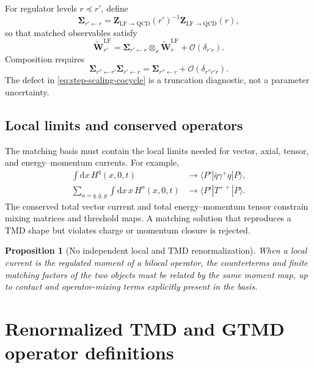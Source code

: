 \documentclass[11pt]{article}
\newtheorem{proposition}[definition]{Proposition}
\newcommand{\dd}{\mathrm{d}}
\newcommand{\LF}{\mathrm{LF}}
\newcommand{\QCD}{\mathrm{QCD}}
\newcommand{\cO}{\mathcal O}
\newcommand{\otimesx}{\mathop{\otimes}_{x}}
\begin{document}
For regulator levels \(r\preceq r'\), define
\begin{equation}
 \bm\Sigma_{r'\leftarrow r}
 =
 \bm Z_{\LF\to\QCD}(r')^{-1}
 \bm Z_{\LF\to\QCD}(r),
 \label{eq:step-scaling-map}
\end{equation}
so that matched observables satisfy
\begin{equation}
 \widetilde{\bm W}^{\LF}_{r'}
 =
 \bm\Sigma_{r'\leftarrow r}\otimesx
 \widetilde{\bm W}^{\LF}_{r}
 +\cO(\delta_{r'r}).
 \label{eq:step-scaling-consistency}
\end{equation}
Composition requires
\begin{equation}
 \bm\Sigma_{r''\leftarrow r'}
 \bm\Sigma_{r'\leftarrow r}
 =
 \bm\Sigma_{r''\leftarrow r}
 +\cO(\delta_{r''r'r}).
 \label{eq:step-scaling-cocycle}
\end{equation}
The defect in \cref{eq:step-scaling-cocycle} is a truncation diagnostic, not a
parameter uncertainty.

\subsection{Local limits and conserved operators}

The matching basis must contain the local limits needed for vector, axial,
tensor, and energy--momentum currents.  For example,
\begin{align}
 \int\dd x\,H^q(x,0,t)
 &\longrightarrow
 \langle P'|\bar q\gamma^+q|P\rangle,
 \label{eq:vector-local-limit}\\
 \sum_{a=q,\bar q,g}\int\dd x\,x\,H^a(x,0,t)
 &\longrightarrow
 \langle P'|T^{++}|P\rangle.
 \label{eq:emt-local-limit}
\end{align}
The conserved total vector current and total energy--momentum tensor constrain
mixing matrices and threshold maps.  A matching solution that reproduces a
TMD shape but violates charge or momentum closure is rejected.

\begin{proposition}[No independent local and TMD renormalization]
When a local current is the regulated moment of a bilocal operator, the
counterterms and finite matching factors of the two objects must be related by
the same moment map, up to contact and operator-mixing terms explicitly
present in the basis.
\end{proposition}

\section{Renormalized TMD and GTMD operator definitions}
\label{sec:renormalized-definitions}
\end{document}
